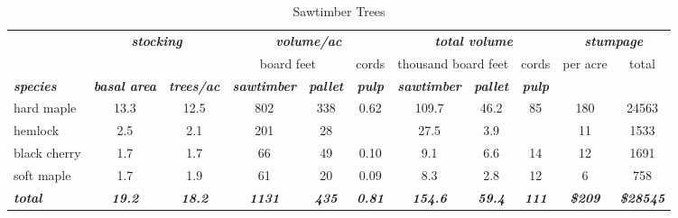 \documentclass[landscape]{article}
\begin{document}
\begin{table}[H]

\caption{\label{tab:unnamed-chunk-19}Sawtimber Trees}
\fontsize{10}{12}\selectfont
\begin{tabular}[t]{lcccccccccc}
\toprule
\multicolumn{1}{c}{\em{\textbf{ }}} & \multicolumn{2}{c}{\em{\textbf{stocking}}} & \multicolumn{3}{c}{\em{\textbf{volume/ac }}} & \multicolumn{3}{c}{\em{\textbf{total volume}}} & \multicolumn{2}{c}{\em{\textbf{stumpage}}} \\
\cmidrule(l{3pt}r{3pt}){2-3} \cmidrule(l{3pt}r{3pt}){4-6} \cmidrule(l{3pt}r{3pt}){7-9} \cmidrule(l{3pt}r{3pt}){10-11}
\multicolumn{3}{c}{ } & \multicolumn{2}{c}{board feet} & \multicolumn{1}{c}{cords} & \multicolumn{2}{c}{thousand board feet} & \multicolumn{1}{c}{cords} & \multicolumn{1}{c}{per acre} & \multicolumn{1}{c}{total} \\
\cmidrule(l{3pt}r{3pt}){4-5} \cmidrule(l{3pt}r{3pt}){6-6} \cmidrule(l{3pt}r{3pt}){7-8} \cmidrule(l{3pt}r{3pt}){9-9} \cmidrule(l{3pt}r{3pt}){10-10} \cmidrule(l{3pt}r{3pt}){11-11}
\rowcolor[HTML]{DCDCDC}  \em{\textbf{species}} & \em{\textbf{basal area}} & \em{\textbf{trees/ac}} & \em{\textbf{sawtimber}} & \em{\textbf{pallet}} & \em{\textbf{pulp}} & \em{\textbf{sawtimber}} & \em{\textbf{pallet}} & \em{\textbf{pulp}} & \em{\textbf{ }} & \em{\textbf{ }}\\
\midrule
\rowcolor{gray!6}  hard maple & 13.3 & 12.5 & 802 & 338 & 0.62 & 109.7 & 46.2 & 85 & 180 & 24563\\
 
hemlock & 2.5 & 2.1 & 201 & 28 &  & 27.5 & 3.9 &  & 11 & 1533\\
 
\rowcolor{gray!6}  black cherry & 1.7 & 1.7 & 66 & 49 & 0.10 & 9.1 & 6.6 & 14 & 12 & 1691\\
 
soft maple & 1.7 & 1.9 & 61 & 20 & 0.09 & 8.3 & 2.8 & 12 & 6 & 758\\
 
\rowcolor{gray!6}  \rowcolor[HTML]{DCDCDC}  \em{\textbf{total}} & \em{\textbf{19.2}} & \em{\textbf{18.2}} & \em{\textbf{1131}} & \em{\textbf{435}} & \em{\textbf{0.81}} & \em{\textbf{154.6}} & \em{\textbf{59.4}} & \em{\textbf{111}} & \em{\textbf{\$209}} & \em{\textbf{\$28545}}\\
\bottomrule
\end{tabular}
\end{table}
\end{document}
